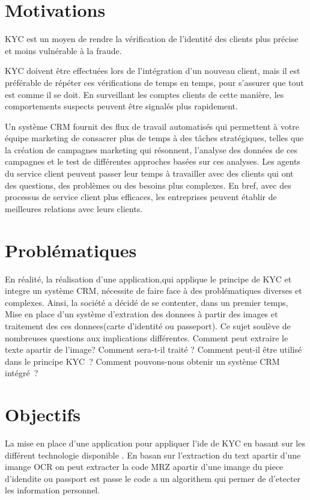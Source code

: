 \section{Motivations}    

KYC est un moyen de rendre la vérification de l'identité des clients plus précise et moins vulnérable à la fraude.

KYC doivent être effectuées lors de l'intégration d'un nouveau client, mais il est préférable de répéter ces vérifications de temps en temps, pour s'assurer que tout est comme il se doit. En surveillant les comptes clients de cette manière, les comportements suspects peuvent être signalés plus rapidement.

Un système CRM fournit des flux de travail automatisés qui permettent à votre équipe marketing de consacrer plus de temps à des tâches stratégiques, telles que la création de campagnes marketing qui résonnent, l'analyse des données de ces campagnes et le test de différentes approches basées sur ces analyses. Les agents du service client peuvent passer leur temps à travailler avec des clients qui ont des questions, des problèmes ou des besoins plus complexes. En bref, avec des processus de service client plus efficaces, les entreprises peuvent établir de meilleures relations avec leurs clients.

\section{Problématiques}	

En réalité, la réalisation d'une application,qui applique le principe de KYC et integre un  système CRM,
nécessite
de faire face à des problématiques diverses et complexes. Ainsi, la société a décidé de se contenter,
dans un premier temps, Mise en place d’un système d’extration des donnees à partir des images et traitement des ces donnees(carte d'identité ou passeport).
Ce sujet soulève de nombreuses questions aux implications différentes. Comment peut extraire le texte apartir de l'image? Comment sera-t-il traité ? Comment peut-il être utilisé dans le principe KYC ? Comment pouvons-nous obtenir un système CRM intégré ?


\section{Objectifs}

La mise en place d'une application pour appliquer l'ide de KYC en basant sur les différent technologie disponible . En basan sur l'extraction du text apartir d'une imange OCR on peut extracter la code MRZ apartir d'une imange du piece d'idendite ou passport est passe le code a un algorithem qui permer de d'etecter les information personnel.


